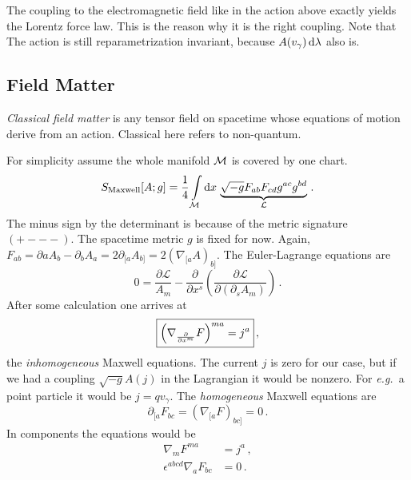 \begin{example}
    The coupling to the electromagnetic field like in the action above exactly yields the
    Lorentz force law.
    This is the reason why it is the right coupling.
    Note that The action is still reparametrization invariant, because
    $A(v_\gamma)\operatorname{d\!}\lambda$ also is.
\end{example}

\subsection{Field Matter}
\begin{defn}
    \textit{Classical field matter} is any tensor field on spacetime whose equations
    of motion derive from an action.
    Classical here refers to non-quantum.
\end{defn}
\begin{example}
    For simplicity assume the whole manifold $\mathcal{M}$ is covered by one chart.
    \begin{equation}
        S_\text{Maxwell}[A;g] = \frac{1}{4} \int\limits_{\mathcal{M}} \operatorname{d\!} x\,\underbrace{\sqrt{-g} F_{ab}F_{cd}g^{ac}g^{bd}}_\mathcal{L}\,.
    \end{equation}
    The minus sign by the determinant is because of the metric signature $(+---)$.
    The spacetime metric $g$ is fixed for now.
    Again, $F_{ab} = \partial a A_b - \partial_b A_a = 2 \partial_{[a}A_{b]} = 2 (\nabla_{[a}A)_{b]}$.
    The Euler-Lagrange equations are
    \begin{equation}
        0 = \frac{\partial \mathcal{L}}{A_m} 
        - \frac{\partial}{\partial x^s}\left( \frac{\partial \mathcal{L}}{\partial(\partial_s A_m)} \right)\,.
    \end{equation}
    After some calculation one arrives at
    \begin{equation}
        \boxed{%
        \left( \nabla_{\frac{\partial}{\partial x^m}} F \right)^{ma} = j^a
    }\,,
    \end{equation}
    the \textit{inhomogeneous} Maxwell equations.
    The current $j$ is zero for our case, but if we had a coupling $\sqrt{-g} A(j)$ in the Lagrangian
    it would be nonzero. For \textit{e.g.}\ a point particle it would be $j = q v_\gamma$.
    The \textit{homogeneous} Maxwell equations are
    \begin{equation}
        \partial_{[a}F_{bc} = \left( \nabla_{[a}F \right)_{bc]} = 0\,.
    \end{equation}
    In components the equations would be
    \begin{align*}
        \nabla_m F^{ma} &= j^a\,,\\
        \epsilon^{abcd}\nabla_a F_{bc} &= 0\,.
    \end{align*}
\end{example}

